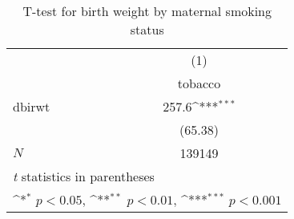 \begin{table}[htbp]\centering
\def\sym#1{\ifmmode^{#1}\else\(^{#1}\)\fi}
\caption{T-test for birth weight by maternal smoking status\label{a1}}
\begin{tabular}{l*{1}{c}}
\hline\hline
            &\multicolumn{1}{c}{(1)}\\
            &\multicolumn{1}{c}{tobacco}\\
\hline
dbirwt      &       257.6\sym{***}\\
            &     (65.38)         \\
\hline
\(N\)       &      139149         \\
\hline\hline
\multicolumn{2}{l}{\footnotesize \textit{t} statistics in parentheses}\\
\multicolumn{2}{l}{\footnotesize \sym{*} \(p<0.05\), \sym{**} \(p<0.01\), \sym{***} \(p<0.001\)}\\
\end{tabular}
\end{table}
